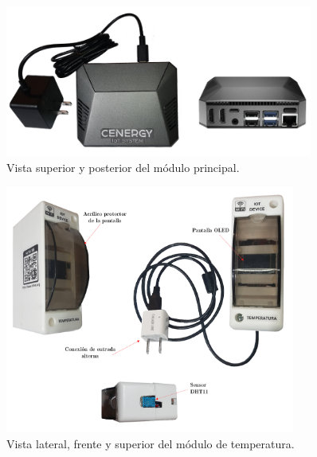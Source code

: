 
\begin{figure}[htpb]
\centering 
\includegraphics[width=0.9\textwidth]{./Figures/principal2.png}
\caption{Vista superior y posterior del módulo principal.}
\label{fig:modPrincipal}
\end{figure}



\begin{figure}[htpb]
\centering 
\includegraphics[width=0.85\textwidth]{./Figures/moduloTemp2.png}
\caption{Vista lateral, frente y superior del módulo de temperatura.}
\label{fig:modTemp}
\end{figure}




